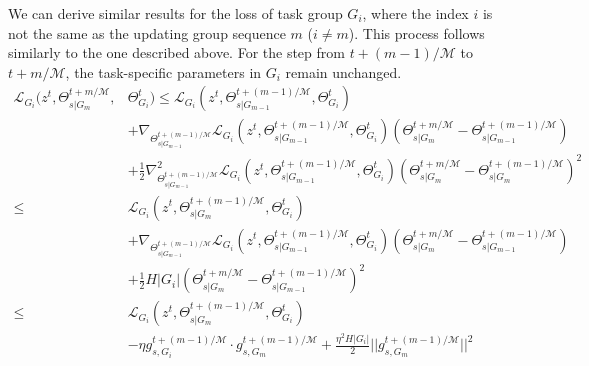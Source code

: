 We can derive similar results for the loss of task group $G_i$, where the index $i$ is not the same as the updating group sequence $m$ ($i \neq m$). This process follows similarly to the one described above. For the step from $t+(m-1)/\mathcal{M}$ to $t+m/\mathcal{M}$, the task-specific parameters in $G_i$ remain unchanged.
\begin{align}
    \mathcal{L}_{G_i} (z^t, \Theta_{s|G_m}^{t+m/\mathcal{M}},& \Theta_{G_i}^t) \leq \mathcal{L}_{G_i} (z^t, \Theta_{s|G_{m-1}}^{t+(m-1)/\mathcal{M}}, \Theta_{G_i}^t)\\
    &+\nabla_{\Theta_{s|G_{m-1}}^{t+(m-1)/\mathcal{M}}}\mathcal{L}_{G_i}(z^t, \Theta_{s|G_{m-1}}^{t+(m-1)/\mathcal{M}}, \Theta_{G_i}^t)(\Theta_{s|G_m}^{t+m/\mathcal{M}}-\Theta_{s|G_{m-1}}^{t+(m-1)/\mathcal{M}})\\
    &+\frac{1}{2}\nabla_{\Theta_{s|G_{m-1}}^{t+(m-1)/\mathcal{M}}}^{2}\mathcal{L}_{G_i}(z^t, \Theta_{s|G_{m-1}}^{t+(m-1)/\mathcal{M}}, \Theta_{G_i}^t)(\Theta_{s|G_m}^{t+m/\mathcal{M}}-\Theta_{s|G_m}^{t+(m-1)/\mathcal{M}})^{2}\\
    \leq &\mathcal{L}_{G_i} (z^t, \Theta_{s|G_m}^{t+(m-1)/\mathcal{M}}, \Theta_{G_i}^t)\\
    &+\nabla_{\Theta_{s|G_{m-1}}^{t+(m-1)/\mathcal{M}}}\mathcal{L}_{G_i}(z^t, \Theta_{s|G_{m-1}}^{t+(m-1)/\mathcal{M}}, \Theta_{G_i}^t)(\Theta_{s|G_m}^{t+m/\mathcal{M}}-\Theta_{s|G_{m-1}}^{t+(m-1)/\mathcal{M}})\\
    &+\frac{1}{2} H|G_i| (\Theta_{s|G_m}^{t+m/\mathcal{M}}-\Theta_{s|G_{m-1}}^{t+(m-1)/\mathcal{M}})^{2}\\
    \leq & \mathcal{L}_{G_i} (z^t, \Theta_{s|G_m}^{t+(m-1)/\mathcal{M}}, \Theta_{G_i}^t)\\
    &- \eta g_{s, G_i}^{t+(m-1)/\mathcal{M}} \cdot g_{s, G_m}^{t+(m-1)/\mathcal{M}} + \frac{\eta^2 H|G_i|}{2}||g_{s, G_m}^{t+(m-1)/\mathcal{M}}||^2\\
\end{align}

